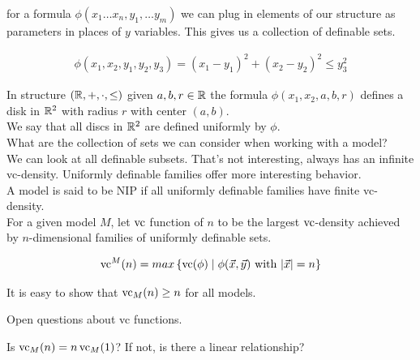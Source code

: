 \documentclass{amsart}
\newcommand{\curly}[1]{\left\{ #1 \right\}}
\begin{document}
\begin{Definition}
	for a formula $\phi(x_1 \ldots x_n, y_1, \ldots y_m)$ we can plug in elements of our structure as parameters in places of $y$ variables. This gives us a collection of definable sets. 
\end{Definition}

\begin{Example}
	\begin{align*}
		\phi(x_1, x_2, y_1, y_2, y_3) = (x_1 - y_1)^2 + (x_2 - y_2)^2 \leq y_3^2
	\end{align*}
\end{Example}

In structure $(\mathbb{R}, +, \cdot, \leq)$ given $a,b,r \in \mathbb{R}$ the formula $\phi(x_1, x_2, a, b, r)$ defines a disk in $\mathbb{R}^2$ with radius $r$ with center $(a,b)$. \\

We say that all discs in $\mathbb{R}^2$ are defined uniformly by $\phi$. \\

What are the collection of sets we can consider when working with a model? \\

We can look at all definable subsets. That's not interesting, always has an infinite vc-density.
Uniformly definable families offer more interesting behavior. \\

A model is said to be NIP if all uniformly definable families have finite vc-density. \\

For a given model $M$, let $\operatorname{vc}$ function of $n$ to be the largest $\operatorname{vc}$-density achieved by $n$-dimensional families of uniformly definable sets.

\begin{align*}
	\vc^M(n) = max \curly{ \vc(\phi) \mid \phi(\vec x, \vec y) \text{ with } |\vec x| = n}
\end{align*}

It is easy to show that $\operatorname{vc}_M(n) \geq n$ for all models.

Open questions about vc functions.

Is $\operatorname{vc}_M(n) = n \operatorname{vc}_M(1)$? If not, is there a linear relationship?
\end{document}

